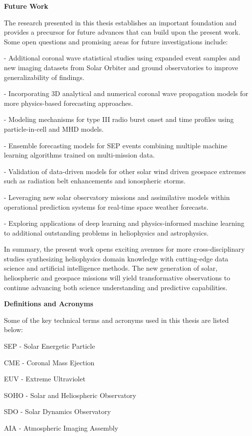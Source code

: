 \documentclass{article}
\begin{document}
\textbf{Future Work}

The research presented in this thesis establishes an important foundation and provides a precursor for future advances that can build upon the present work. Some open questions and promising areas for future investigations include:

- Additional coronal wave statistical studies using expanded event samples and new imaging datasets from Solar Orbiter and ground observatories to improve generalizability of findings.

- Incorporating 3D analytical and numerical coronal wave propagation models for more physics-based forecasting approaches. 

- Modeling mechanisms for type III radio burst onset and time profiles using particle-in-cell and MHD models. 

- Ensemble forecasting models for SEP events combining multiple machine learning algorithms trained on multi-mission data.

- Validation of data-driven models for other solar wind driven geospace extremes such as radiation belt enhancements and ionospheric storms.

- Leveraging new solar observatory missions and assimilative models within operational prediction systems for real-time space weather forecasts.

- Exploring applications of deep learning and physics-informed machine learning to additional outstanding problems in heliophysics and astrophysics.

In summary, the present work opens exciting avenues for more cross-disciplinary studies synthesizing heliophysics domain knowledge with cutting-edge data science and artificial intelligence methods. The new generation of solar, heliospheric and geospace missions will yield transformative observations to continue advancing both science understanding and predictive capabilities.


\textbf{Definitions and Acronyms}

Some of the key technical terms and acronyms used in this thesis are listed below:

SEP - Solar Energetic Particle

CME - Coronal Mass Ejection 

EUV - Extreme Ultraviolet

SOHO - Solar and Heliospheric Observatory

SDO - Solar Dynamics Observatory

AIA - Atmospheric Imaging Assembly 
\end{document}
